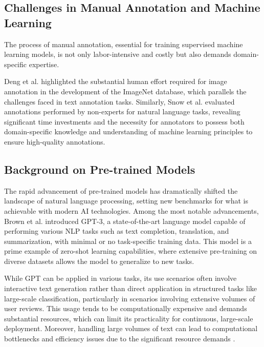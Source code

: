 \subsection{Challenges in Manual Annotation and Machine Learning}
The process of manual annotation, essential for training supervised machine learning models, is not only labor-intensive and costly but also demands domain-specific expertise.

Deng et al. \cite{Deng2009} highlighted the substantial human effort required for image annotation in the development of the ImageNet database, which parallels the challenges faced in text annotation tasks. Similarly, Snow et al. \cite{Snow2008} evaluated annotations performed by non-experts for natural language tasks, revealing significant time investments and the necessity for annotators to possess both domain-specific knowledge and understanding of machine learning principles to ensure high-quality annotations.


\subsection{Background on Pre-trained Models}

The rapid advancement of pre-trained models has dramatically shifted the landscape of natural language processing, setting new benchmarks for what is achievable with modern AI technologies. Among the most notable advancements, Brown et al. \cite{Brown2020} introduced GPT-3, a state-of-the-art language model capable of performing various NLP tasks such as text completion, translation, and summarization, with minimal or no task-specific training data. This model is a prime example of zero-shot learning capabilities, where extensive pre-training on diverse datasets allows the model to generalize to new tasks.

While GPT can be applied in various tasks, its use scenarios often involve interactive text generation rather than direct application in structured tasks like large-scale classification, particularly in scenarios involving extensive volumes of user reviews. This usage tends to be computationally expensive and demands substantial resources, which can limit its practicality for continuous, large-scale deployment. Moreover, handling large volumes of text can lead to computational bottlenecks and efficiency issues due to the significant resource demands \cite{strubell-etal-2019-energy, chen2023frugalgptuselargelanguage, Narayanan2021, Rae2021, Brown2020}.




